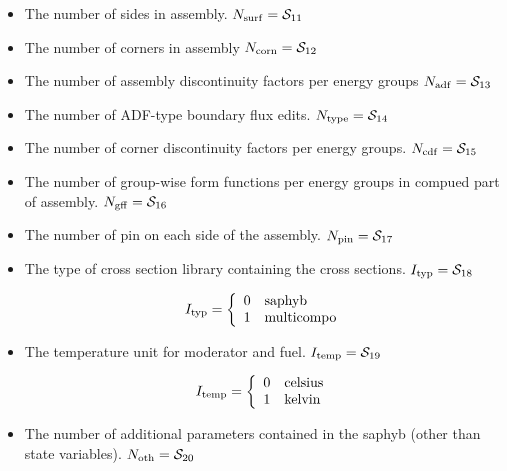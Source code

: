 \begin{itemize}
\item The number of sides in assembly. $N_{\rm surf} = \mathcal{S}_{11}$

\item The number of corners in assembly $N_{\rm corn} = \mathcal{S}_{12}$

\item The number of assembly discontinuity factors per energy groups $N_{\rm adf} = \mathcal{S}_{13}$

\item The number of ADF-type boundary flux edits. $N_{\rm type} = \mathcal{S}_{14}$

\item The number of corner discontinuity factors per energy groups. $N_{\rm cdf} = \mathcal{S}_{15}$

\item The number of group-wise form functions per energy groups in compued part of assembly. $N_{\rm gff} = \mathcal{S}_{16}$

\item The number of pin on each side of the assembly. $N_{\rm pin} = \mathcal{S}_{17}$

\item The type of cross section library containing the cross sections. $I_{\rm typ} = \mathcal{S}_{18}$

\begin{displaymath} I_{\rm typ} = \left\{
\begin{array}{rl}
 0 & \textrm{saphyb} \\
 1 & \textrm{multicompo} \\
\end{array} \right.
\end{displaymath}

\item The temperature unit for moderator and fuel. $I_{\rm temp} = \mathcal{S}_{19}$

\begin{displaymath} I_{\rm temp} = \left\{
\begin{array}{rl}
 0 & \textrm{celsius} \\
 1 & \textrm{kelvin } \\
\end{array} \right.
\end{displaymath}

\item The number of additional parameters contained in the saphyb (other than state  variables). $N_{\rm oth} = \mathcal{S}_{20}$


\end{itemize}
